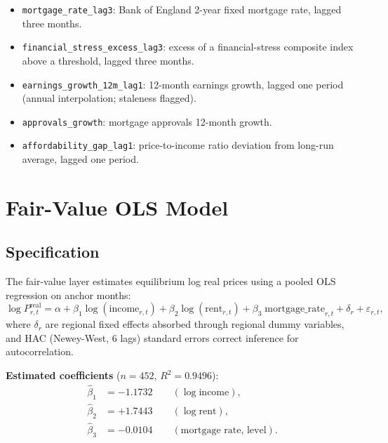 \documentclass[11pt,a4paper]{article}
\theoremstyle{plain}
\theoremstyle{definition}
\begin{document}
\begin{itemize}[leftmargin=1.8em]
  \item \texttt{mortgage\_rate\_lag3}: Bank of England 2-year fixed
        mortgage rate, lagged three months.
  \item \texttt{financial\_stress\_excess\_lag3}: excess of a
        financial-stress composite index above a threshold, lagged three months.
  \item \texttt{earnings\_growth\_12m\_lag1}: 12-month earnings growth,
        lagged one period (annual interpolation; staleness flagged).
  \item \texttt{approvals\_growth}: mortgage approvals 12-month growth.
  \item \texttt{affordability\_gap\_lag1}: price-to-income ratio deviation
        from long-run average, lagged one period.
\end{itemize}

\section{Fair-Value OLS Model}

\subsection{Specification}

The fair-value layer estimates equilibrium log real prices using a pooled
OLS regression on anchor months:
\begin{equation}\label{eq:fv}
  \log P^{\mathrm{real}}_{r,t}
  = \alpha
  + \beta_1\log(\text{income}_{r,t})
  + \beta_2\log(\text{rent}_{r,t})
  + \beta_3\;\text{mortgage\_rate}_{r,t}
  + \delta_r
  + \varepsilon_{r,t},
\end{equation}
where $\delta_r$ are regional fixed effects absorbed through regional
dummy variables, and HAC (Newey-West, 6 lags) standard errors correct
inference for autocorrelation.

\textbf{Estimated coefficients} ($n = 452$, $R^2 = 0.9496$):
\begin{align*}
  \hat\beta_1 &= -1.1732 \qquad (\log\text{income}), \\
  \hat\beta_2 &= +1.7443 \qquad (\log\text{rent}), \\
  \hat\beta_3 &= -0.0104 \qquad (\text{mortgage rate, level}).
\end{align*}
\end{document}

